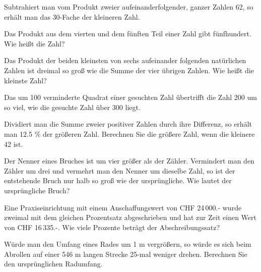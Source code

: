 \begin{bbwAufgabenBlock}
\item Subtrahiert man vom Produkt zweier aufeinanderfolgender, ganzer
Zahlen 62, so erhält man das 30-Fache der kleineren Zahl.


\item Das Produkt aus dem vierten und dem fünften Teil einer Zahl gibt
fünfhundert. Wie heißt die Zahl?


\item Das Produkt der beiden kleinsten von sechs aufeinander folgenden
natürlichen Zahlen ist dreimal so groß wie die Summe der vier übrigen
Zahlen. Wie heißt die kleinste Zahl?


\item Das um 100 verminderte Quadrat einer gesuchten Zahl übertrifft
die Zahl 200 um so viel, wie die gesuchte Zahl über 300 liegt.


\item Dividiert man die Summe zweier positiver Zahlen durch ihre
Differenz, so erhält man 12.5 \% der größeren Zahl. Berechnen Sie die
größere Zahl, wenn die kleinere 42 ist.


\item Der Nenner eines Bruches ist um vier größer als der
Zähler. Vermindert man den Zähler um drei und vermehrt man den Nenner
um dieselbe Zahl, so ist der entstehende Bruch nur halb so groß wie
der ursprüngliche. Wie lautet der ursprüngliche Bruch?


\item Eine Praxiseinrichtung mit einem Anschaffungswert von CHF
24\,000.- wurde zweimal mit dem gleichen Prozentsatz abgeschrieben und
hat zur Zeit einen Wert von CHF 16\,335.-. Wie viele Prozente beträgt
der Abschreibungssatz?


\item Würde man den Umfang eines Rades um 1 m vergrößern, so würde es
sich beim Abrollen auf einer 546 m langen Strecke 25-mal weniger
drehen. Berechnen Sie den ursprünglichen Radumfang.


\end{bbwAufgabenBlock}
